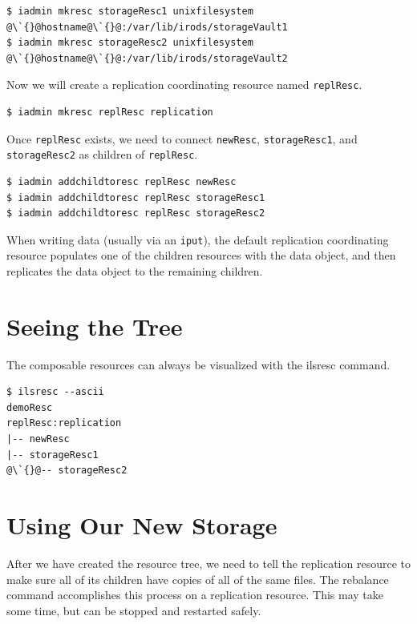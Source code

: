 \documentclass[10pt,oneside]{memoir}
\begin{document}
\begin{lstlisting}[basicstyle=\scriptsize\ttfamily]
$ iadmin mkresc storageResc1 unixfilesystem @\`{}@hostname@\`{}@:/var/lib/irods/storageVault1
$ iadmin mkresc storageResc2 unixfilesystem @\`{}@hostname@\`{}@:/var/lib/irods/storageVault2
\end{lstlisting}

Now we will create a replication coordinating resource named \texttt{replResc}.

\begin{lstlisting}
$ iadmin mkresc replResc replication
\end{lstlisting}

Once \texttt{replResc} exists, we need to connect \texttt{newResc}, \texttt{storageResc1}, and \texttt{storageResc2} as children of \texttt{replResc}.

\begin{lstlisting}
$ iadmin addchildtoresc replResc newResc
$ iadmin addchildtoresc replResc storageResc1
$ iadmin addchildtoresc replResc storageResc2
\end{lstlisting}

When writing data (usually via an \texttt{iput}), the default replication coordinating resource populates one of the children resources with the data object, and then replicates the data object to the remaining children.

\section{Seeing the Tree}

The composable resources can always be visualized with the ilsresc command.

\begin{lstlisting}
$ ilsresc --ascii
demoResc
replResc:replication
|-- newResc
|-- storageResc1
@\`{}@-- storageResc2
\end{lstlisting}

\section{Using Our New Storage}

After we have created the resource tree, we need to tell the replication resource to make sure all of its children have copies of all of the same files. The rebalance command accomplishes this process on a replication resource. This may take some time, but can be stopped and restarted safely.
\end{document}
